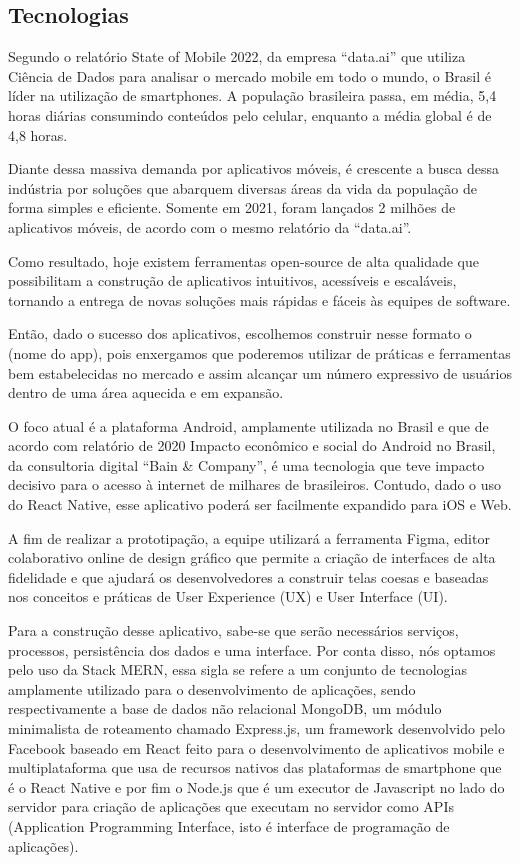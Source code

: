\begin{apendicesenv}
	
	
	\section{Tecnologias}
	Segundo o relatório State of Mobile 2022, da empresa “data.ai” que utiliza Ciência de Dados para analisar o mercado mobile em todo o mundo, o Brasil é líder na utilização de smartphones. A população brasileira passa, em média, 5,4 horas diárias consumindo conteúdos pelo celular, enquanto a média global é de 4,8 horas. 
	
	Diante dessa massiva demanda por aplicativos móveis, é crescente a busca dessa indústria por soluções que abarquem diversas áreas da vida da população de forma simples e eficiente. Somente em 2021, foram lançados 2 milhões de aplicativos móveis, de acordo com o mesmo relatório da “data.ai”.
	
	Como resultado, hoje existem ferramentas open-source de alta qualidade que possibilitam a construção de aplicativos intuitivos, acessíveis e escaláveis, tornando a entrega de novas soluções mais rápidas e fáceis às equipes de software. 
	
	Então, dado o sucesso dos aplicativos, escolhemos construir nesse formato o (nome do app), pois enxergamos que poderemos utilizar de práticas e ferramentas bem estabelecidas no mercado e assim alcançar um número expressivo de usuários dentro de uma área aquecida e em expansão.
	
	O foco atual é a plataforma Android, amplamente utilizada no Brasil e que de acordo com relatório de 2020 Impacto econômico e social do Android no Brasil, da consultoria digital “Bain & Company”, é uma tecnologia que teve impacto decisivo para o acesso à internet de milhares de brasileiros. Contudo, dado o uso do React Native, esse aplicativo poderá ser facilmente expandido para iOS e Web.
	
	A fim de realizar a prototipação, a equipe utilizará a ferramenta Figma, editor colaborativo online de design gráfico que permite a criação de interfaces de alta fidelidade e que ajudará os desenvolvedores a construir telas coesas e baseadas nos conceitos e práticas de User Experience (UX) e User Interface (UI).
	
	Para a construção desse aplicativo, sabe-se que serão necessários serviços, processos, persistência dos dados e uma interface. Por conta disso, nós optamos pelo uso da Stack MERN, essa sigla se refere a um conjunto de tecnologias amplamente utilizado para o desenvolvimento de aplicações, sendo respectivamente a base de dados não relacional MongoDB, um módulo minimalista de roteamento chamado Express.js, um framework desenvolvido pelo Facebook baseado em React feito para o desenvolvimento de aplicativos mobile e multiplataforma que usa de recursos nativos das plataformas de smartphone que é o React Native e por fim o Node.js que é um executor de Javascript no lado do servidor para criação de aplicações que executam no servidor como APIs (Application Programming Interface, isto é interface de programação de aplicações).
	

\end{apendicesenv}
